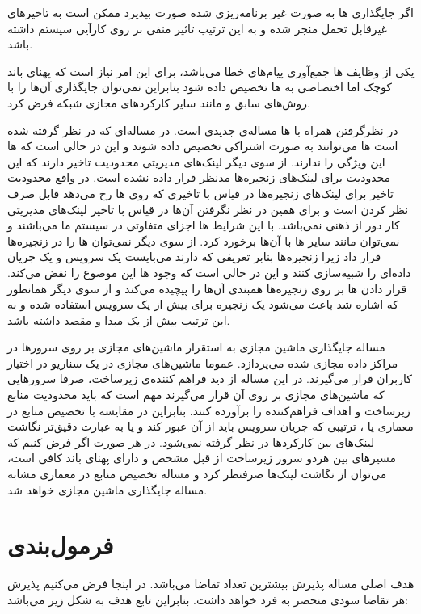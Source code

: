 اگر جایگذاری ها به صورت غیر برنامه‌ریزی شده صورت بپذیرد
ممکن است به تاخیرهای غیرقابل تحمل منجر شده و به این ترتیب تاثیر منفی بر روی کارآیی سیستم
داشته باشد.

یکی از وظایف ها جمع‌آوری پیام‌های خطا می‌باشد،
برای این امر نیاز است که پهنای باند کوچک اما اختصاصی به ها
تخصیص داده شود بنابراین نمی‌توان جایگذاری آن‌ها را با روش‌های سابق و مانند سایر
کارکردهای مجازی شبکه فرض کرد.

در نظرگرفتن  همراه با ها مساله‌ی جدیدی است.
در مساله‌ای که در نظر گرفته شده است ها می‌توانند به صورت اشتراکی
تخصیص داده شوند و این در حالی است که ها این ویژگی را ندارند.
از سوی دیگر لینک‌های مدیریتی محدودیت تاخیر دارند که این محدودیت برای لینک‌های زنجیره‌ها مدنظر قرار داده نشده است.
در واقع محدودیت تاخیر برای لینک‌های زنجیره‌ها در قیاس با تاخیری که روی ها رخ می‌دهد قابل صرف نظر کردن است و برای همین
در نظر نگرفتن آن‌ها در قیاس با تاخیر لینک‌های مدیریتی کار دور از ذهنی نمی‌باشد.
با این شرایط ها اجزای متفاوتی در سیستم ما می‌باشند و نمی‌توان مانند سایر ها با آن‌ها برخورد کرد.
از سوی دیگر نمی‌توان ها را در زنجیره‌ها قرار داد
زیرا زنجیره‌ها بنابر تعریفی که دارند می‌بایست یک سرویس و یک جریان داده‌ای را شبیه‌سازی کنند
و این در حالی است که وجود ها این موضوع را نقض می‌کند.
قرار دادن ها بر روی زنجیره‌ها
همبندی آن‌ها را پیچیده می‌کند و از سوی دیگر همانطور که اشاره شد باعث می‌شود یک زنجیره
برای بیش از یک سرویس استفاده شده و به این ترتیب بیش از یک مبدا و مقصد داشته باشد.

مساله جایگذاری ماشین مجازی به استقرار ماشین‌های مجازی بر روی سرورها در مراکز داده مجازی شده می‌پردازد.
عموما ماشین‌های مجازی در یک سناریو  در اختیار کاربران قرار می‌گیرند.
در این مساله از دید فراهم کننده‌ی زیرساخت، صرفا سرورهایی که ماشین‌های مجازی بر روی آن قرار می‌گیرند مهم است که باید محدودیت منابع زیرساخت
و اهداف فراهم‌کننده را برآورده کنند.
بنابراین در مقایسه با تخصیص منابع در معماری  یا ،
ترتیبی که جریان سرویس باید از آن عبور کند و یا به عبارت دقیق‌تر نگاشت لینک‌های بین کارکردها
در نظر گرفته نمی‌شود.
در هر صورت اگر فرض کنیم که مسیرهای بین هردو سرور زیرساخت از قبل مشخص و دارای پهنای باند کافی است،
می‌توان از نگاشت لینک‌ها صرفنظر کرد و مساله تخصیص منابع در معماری 
مشابه مساله جایگذاری ماشین مجازی خواهد شد.

\section{فرمول‌بندی}

هدف اصلی مساله پذیرش بیشترین تعداد تقاضا می‌باشد. در اینجا فرض می‌کنیم پذیرش هر تقاضا سودی منحصر به فرد خواهد داشت.
بنابراین تابع هدف به شکل زیر می‌باشد:

